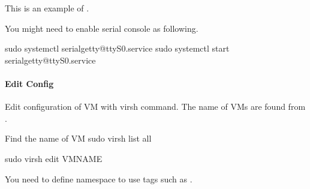 \documentclass[a4paper,11pt,openany,oneside,english]{sphinxmanual}
\begin{document}
This is an example of .

\begin{sphinxVerbatim}[commandchars=\\\{\},formatcom=\footnotesize]
\end{sphinxVerbatim}

You might need to enable serial console as following.

\begin{sphinxVerbatim}[commandchars=\\\{\},formatcom=\footnotesize]
sudo systemctl  serial\PYGZhy{}getty@ttyS0.service
sudo systemctl start serial\PYGZhy{}getty@ttyS0.service
\end{sphinxVerbatim}


\paragraph{Edit Config}
\label{\detokenize{gsg/howto_use:edit-config}}
Edit configuration of VM with virsh command. The name of VMs are found from
.

\begin{sphinxVerbatim}[commandchars=\\\{\},formatcom=\footnotesize]
 Find the name of VM
 sudo virsh list \PYGZhy{}\PYGZhy{}all

 sudo virsh edit VM\PYGZus{}NAME
\end{sphinxVerbatim}

You need to define namespace  to use tags such as
.
\end{document}
